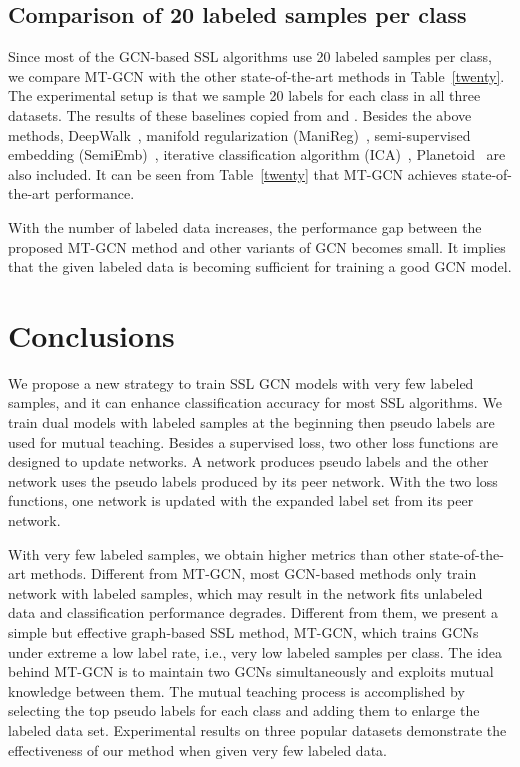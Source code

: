 \documentclass{article}
\begin{document}
\subsection{Comparison of 20 labeled samples per class}
Since most of the GCN-based SSL algorithms use 20 labeled samples per class, we compare MT-GCN with the other state-of-the-art methods in Table~\ref{twenty}. The experimental setup is that we sample 20 labels for each class in all three datasets. The results of these baselines copied from \cite{kipf2016semi} and \cite{li2018deeper}. Besides the above methods, DeepWalk~\cite{perozzi2014deepwalk}, manifold regularization (ManiReg)~\cite{belkin2006manifold}, semi-supervised embedding (SemiEmb)~\cite{weston2012deep}, iterative classification algorithm (ICA)~\cite{sen2008collective}, Planetoid~\cite{yang2016revisiting} are also included. It can be seen from Table~\ref{twenty} that MT-GCN achieves state-of-the-art performance.

With the number of labeled data increases, the performance gap between the proposed MT-GCN method and other variants of GCN becomes small. It implies that the given labeled data is becoming sufficient for training a good GCN model.
\section{Conclusions}\label{Conclusions}
We propose a new strategy to train SSL GCN models with very few labeled samples, and it can enhance classification accuracy for most SSL algorithms. We train dual models with labeled samples at the beginning then pseudo labels are used for mutual teaching. Besides a supervised loss, two other loss functions are designed to update networks. A network produces pseudo labels and the other network uses the pseudo labels produced by its peer network. With the two loss functions, one network is updated with the expanded label set from its peer network.

With very few labeled samples, we obtain higher metrics than other state-of-the-art methods. Different from MT-GCN, most GCN-based methods only train network with labeled samples, which may result in the network fits unlabeled data and classification performance degrades. Different from them, we present a simple but effective graph-based SSL method, MT-GCN, which trains GCNs under extreme a low label rate, i.e., very low labeled samples per class. The idea behind MT-GCN is to maintain two GCNs simultaneously and exploits mutual knowledge between them. The mutual teaching process is accomplished by selecting the top  pseudo labels for each class and adding them to enlarge the labeled data set. Experimental results on three popular datasets demonstrate the effectiveness of our method when given very few labeled data.
\end{document}
